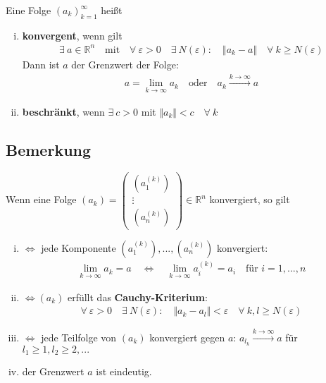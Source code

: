 \documentclass[11pt,a4paper]{book}
\newcommand {\Rn}	{\mathbb{R}^n}
\newcommand{\1}    	{\mathbbm{1}}
\begin{document}
Eine Folge \((a_k)_{k=1}^\infty \) heißt
\begin{enumerate}[(i)]
	\item \textbf{konvergent}, wenn gilt
	\begin{align*}
		\exists~ a \in \Rn \quad \textrm{mit} \quad \forall~ \varepsilon > 0 \quad \exists~ N(\varepsilon) : \quad \Vert a_k - a \Vert \quad \forall~ k \geqslant N(\varepsilon)
	\end{align*}
	Dann ist \(a\) der Grenzwert der Folge:
	\begin{align*}
		a = \lim_{k \rightarrow \infty} a_k \quad \textrm{oder} \quad a_k \stackrel{k \rightarrow \infty}{\rightarrow} a
	\end{align*}
	\item \textbf{beschränkt}, wenn \(\exists~ c > 0 \) mit \(\Vert a_k \Vert < c \quad \forall~ k \)
\end{enumerate}

\subsection{Bemerkung}

Wenn eine Folge \((a_k) = \left( \begin{array}{c} \left( a_1^{(k)} \right) \\ \vdots \\ \left( a_n^{(k)} \right)	\end{array} \right) \in \Rn\) konvergiert, so gilt
\begin{enumerate}[(i)]
	\item  \(\Leftrightarrow\) jede Komponente \( \left( a_1^{(k)}\right), ..., \left( a_n^{(k)} \right) \) konvergiert:
	\begin{align*}
		\lim_{k \rightarrow \infty} a_k = a \quad \Leftrightarrow \quad \lim_{k \rightarrow \infty} a_i^{(k)} = a_i \quad \textrm{für } i = 1, ..., n
	\end{align*}
	\item \(\Leftrightarrow (a_k) \) erfüllt das \textbf{Cauchy-Kriterium}:
	\begin{align*}
		\forall~ \varepsilon > 0 \quad \exists~ N(\varepsilon) : \quad \Vert a_k - a_l \Vert < \varepsilon \quad \forall~ k,l \geqslant N(\varepsilon)
	\end{align*}
	\item \(\Leftrightarrow\) jede Teilfolge von \((a_k)\) konvergiert gegen \(a\): \( a_{l_k} \stackrel{k \rightarrow \infty}{\rightarrow} a \) für \( l_1 \geqslant 1, l_2 \geqslant 2, ...\)
	\item der Grenzwert \(a\) ist eindeutig.
\end{enumerate}
\end{document}
